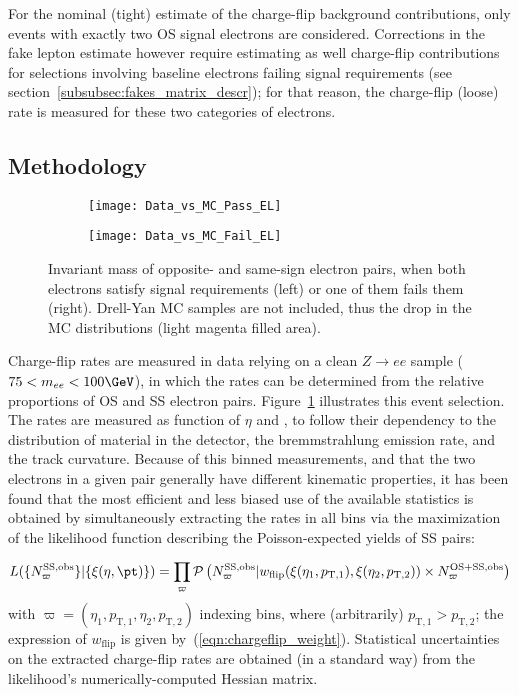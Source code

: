 For the nominal (tight) estimate of the charge-flip background contributions, only events with exactly two OS signal electrons are considered. 
Corrections in the fake lepton estimate however require estimating as well charge-flip contributions for selections involving 
baseline electrons failing signal requirements (see section~\ref{subsubsec:fakes_matrix_descr}); 
for that reason, the charge-flip (loose) rate is measured for these two categories of electrons. 

\subsection{Methodology}
\label{subsec:chargeflip_method}

\begin{figure}[t!]
\centering
\begin{subfigure}[b]{0.45\textwidth}
	\texttt{[image: Data\_vs\_MC\_Pass\_EL]}
\end{subfigure}
\begin{subfigure}[b]{0.45\textwidth}
	\texttt{[image: Data\_vs\_MC\_Fail\_EL]}
\end{subfigure}
\caption{Invariant mass of opposite- and same-sign electron pairs, 
when both electrons satisfy signal requirements (left) or one of them fails them (right). Drell-Yan MC samples are not included, thus the drop in the MC distributions (light magenta filled area).}
\label{fig:chargeflip_mee}
\end{figure}

Charge-flip rates are measured in data relying on a clean $Z\to ee$ sample ($75<m_{ee}<100 \GeV$), 
in which the rates can be determined from the relative proportions of OS and SS electron pairs. 
Figure~\ref{fig:chargeflip_mee} illustrates this event selection. 
The rates are measured as function of $\eta$ and \pt, to follow their dependency to the distribution of material in the detector, 
the bremmstrahlung emission rate, and the track curvature. 
Because of this binned measurements, and that the two electrons in a given pair generally have different kinematic properties, 
it has been found that the most efficient and less biased use of the available statistics 
is obtained by simultaneously extracting the rates in all bins via the maximization of the likelihood function describing the 
Poisson-expected yields of SS pairs: 

\begin{align}
L(\{N^\text{SS,obs}_\varpi\}|\{\xi(\eta,\pt)\}) 
= \prod_{\varpi} \mathcal P\left(N^\text{SS,obs}_\varpi|w_\text{flip}(\xi(\eta_1,p_{\mathrm{T},1}),\xi(\eta_2,p_{\mathrm{T},2}))\times N^\text{OS+SS,obs}_\varpi\right)
\label{eqn:chargeflip_likelihood}
\end{align}
with $\varpi=(\eta_1,p_{\mathrm{T},1},\eta_2,p_{\mathrm{T},2})$ indexing bins, where (arbitrarily) $p_{\mathrm{T},1}>p_{\mathrm{T},2}$; 
the expression of $w_\text{flip}$ is given by~(\ref{eqn:chargeflip_weight}). 
Statistical uncertainties on the extracted charge-flip rates are obtained (in a standard way) from the likelihood's numerically-computed Hessian matrix. 

